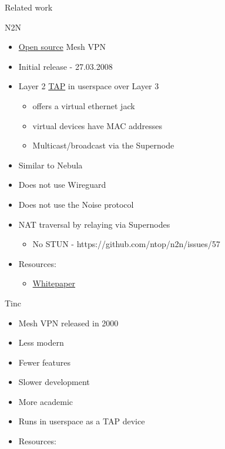 \begin{frame}[fragile]{Related work}
\begin{block}{N2N}
\protect\hypertarget{n2n}{}
\begin{itemize}
\tightlist
\item
  \href{https://github.com/ntop/n2n}{Open source} Mesh VPN
\item
  Initial release - 27.03.2008
\item
  Layer 2 \href{notes/02021-internet-protocol}{TAP} in userspace over
  Layer 3

  \begin{itemize}
  \tightlist
  \item
    offers a virtual ethernet jack
  \item
    virtual devices have MAC addresses
  \item
    Multicast/broadcast via the Supernode
  \end{itemize}
\item
  Similar to Nebula
\item
  Does not use Wireguard
\item
  Does not use the Noise protocol
\item
  NAT traversal by relaying via Supernodes

  \begin{itemize}
  \tightlist
  \item
    No STUN - https://github.com/ntop/n2n/issues/57
  \end{itemize}
\item
  Resources:

  \begin{itemize}
  \tightlist
  \item
    \href{http://luca.ntop.org/n2n.pdf}{Whitepaper}
  \end{itemize}
\end{itemize}
\end{block}

\begin{block}{Tinc}
\protect\hypertarget{tinc}{}
\begin{itemize}
\tightlist
\item
  Mesh VPN released in 2000
\item
  Less modern
\item
  Fewer features
\item
  Slower development
\item
  More academic
\item
  Runs in userspace as a TAP device
\item
  Resources:


\end{itemize}
\end{block}
\end{frame}
